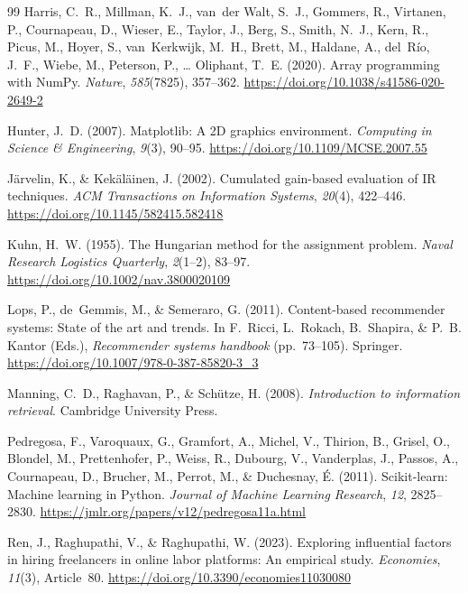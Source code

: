 \begin{thebibliography}{99}
Harris, C.~R., Millman, K.~J., van~der Walt, S.~J., Gommers, R., Virtanen, P., Cournapeau, D., Wieser, E., Taylor, J., Berg, S., Smith, N.~J., Kern, R., Picus, M., Hoyer, S., van~Kerkwijk, M.~H., Brett, M., Haldane, A., del~R\'{i}o, J.~F., Wiebe, M., Peterson, P., \ldots{} Oliphant, T.~E. (2020). Array programming with NumPy. \textit{Nature}, \textit{585}(7825), 357--362. \url{https://doi.org/10.1038/s41586-020-2649-2}

Hunter, J.~D. (2007). Matplotlib: A 2D graphics environment. \textit{Computing in Science \& Engineering}, \textit{9}(3), 90--95. \url{https://doi.org/10.1109/MCSE.2007.55}

J\"{a}rvelin, K., \& Kek\"{a}l\"{a}inen, J. (2002). Cumulated gain-based evaluation of IR techniques. \textit{ACM Transactions on Information Systems}, \textit{20}(4), 422--446. \url{https://doi.org/10.1145/582415.582418}

Kuhn, H.~W. (1955). The Hungarian method for the assignment problem. \textit{Naval Research Logistics Quarterly}, \textit{2}(1--2), 83--97. \url{https://doi.org/10.1002/nav.3800020109}

Lops, P., de~Gemmis, M., \& Semeraro, G. (2011). Content-based recommender systems: State of the art and trends. In F.~Ricci, L.~Rokach, B.~Shapira, \& P.~B. Kantor (Eds.), \textit{Recommender systems handbook} (pp.~73--105). Springer. \url{https://doi.org/10.1007/978-0-387-85820-3_3}

Manning, C.~D., Raghavan, P., \& Sch\"{u}tze, H. (2008). \textit{Introduction to information retrieval}. Cambridge University Press.

Pedregosa, F., Varoquaux, G., Gramfort, A., Michel, V., Thirion, B., Grisel, O., Blondel, M., Prettenhofer, P., Weiss, R., Dubourg, V., Vanderplas, J., Passos, A., Cournapeau, D., Brucher, M., Perrot, M., \& Duchesnay, \'{E}. (2011). Scikit-learn: Machine learning in Python. \textit{Journal of Machine Learning Research}, \textit{12}, 2825--2830. \url{https://jmlr.org/papers/v12/pedregosa11a.html}

Ren, J., Raghupathi, V., \& Raghupathi, W. (2023). Exploring influential factors in hiring freelancers in online labor platforms: An empirical study. \textit{Economies}, \textit{11}(3), Article~80. \url{https://doi.org/10.3390/economies11030080}


\end{thebibliography}
